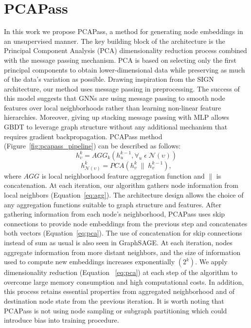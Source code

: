 \documentclass[nohyperref]{article}
\theoremstyle{plain}
\theoremstyle{definition}
\theoremstyle{remark}
\begin{document}
\section{PCAPass}
In this work we propose PCAPass, a method for generating node embeddings in an unsupervised manner. 
The key building block of the architecture is the Principal Component Analysis (PCA) dimensionality reduction process combined with the message passing mechanism. 
PCA is based on selecting only the first principal components to obtain lower-dimensional data while preserving as much of the data's variation as possible.
Drawing inspiration from the SIGN architecture, our method uses message passing in preprocessing.
The success of this model suggests that GNNs are using message passing to smooth node features over local neighborhoods rather than learning non-linear feature hierarchies. 
Moreover, giving up stacking message passing with MLP allows GBDT to leverage graph structure without any additional mechanism that requires gradient backpropagation. 
PCAPass method (Figure~\ref{fig:pcapass_pipeline}) can be described as follows:
\begin{equation}
h^k _\upsilon = AGG_k(h^{k-1}_u, \forall_u  \; \epsilon  \; \mathcal{N(\upsilon)})
\label{eq:agg}
\end{equation}
\begin{equation}
h^k_\mathcal{N(\upsilon)} = PCA(h_v^k \; \| \; h_v^{k-1}),
\label{eq:pca}
\end{equation}
where $AGG$ is local neighborhood feature aggregation function and $\|$ is concatenation. 
At each iteration, our algorithm gathers node information from local neighbors (Equation~\ref{eq:agg}). 
The architecture design allows the choice of any aggregation functions suitable to graph structure and features. 
After gathering information from each node's neighborhood, PCAPass uses skip connections to provide node embeddings from the previous step and concatenates both vectors (Equation~\ref{eq:pca}). 
The use of concatenation for skip connections instead of sum as usual is also seen in GraphSAGE.
At each iteration, nodes aggregate information from more distant neighbors, and the size of information used to compute new embeddings increases exponentially $(2^k)$.
We apply dimensionality reduction (Equation ~\ref{eq:pca}) at each step of the algorithm to overcome large memory consumption and high computational costs.
In addition, this process retains essential properties from aggregated neighborhood and of destination node state from the previous iteration.   
It is worth noting that PCAPass is not using node sampling or subgraph partitioning which could introduce bias into training procedure.
\end{document}
